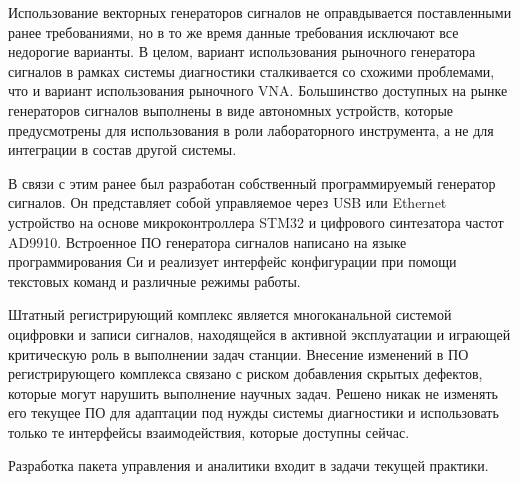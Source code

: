 \documentclass{report}
\begin{document}
Использование векторных генераторов сигналов не оправдывается поставленными ранее требованиями, но в то же время данные требования исключают все недорогие варианты. В целом, вариант использования рыночного генератора сигналов в рамках системы диагностики сталкивается со схожими проблемами, что и вариант использования рыночного VNA. Большинство доступных на рынке генераторов сигналов выполнены в виде автономных устройств, которые предусмотрены для использования в роли лабораторного инструмента, а не для интеграции в состав другой системы.

В связи с этим ранее был разработан собственный программируемый генератор сигналов. Он представляет собой управляемое через USB или Ethernet устройство на основе микроконтроллера STM32 и цифрового синтезатора частот AD9910. Встроенное ПО генератора сигналов написано на языке программирования Си и реализует интерфейс конфигурации при помощи текстовых команд и различные режимы работы.

Штатный регистрирующий комплекс является многоканальной системой оцифровки и записи сигналов, находящейся в активной эксплуатации и играющей критическую роль в выполнении  задач станции. Внесение изменений в ПО регистрирующего комплекса связано с риском добавления скрытых дефектов, которые могут нарушить выполнение научных задач. Решено никак не изменять его текущее ПО для адаптации под нужды системы диагностики и использовать только те интерфейсы взаимодействия, которые доступны сейчас.

Разработка пакета управления и аналитики входит в задачи текущей практики.





\end{document}
